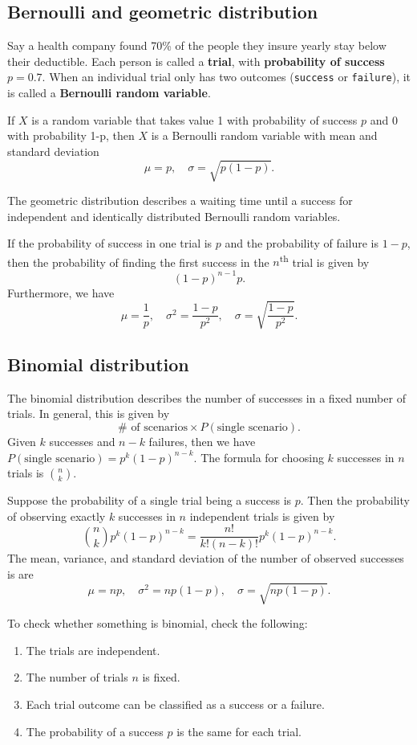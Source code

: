 \subsection{Bernoulli and geometric distribution}
Say a health company found 70\% of the people they insure yearly stay below their deductible. Each person is called a \textbf{trial}, with \textbf{probability of success} $p=0.7$. When an individual trial only has two outcomes (\texttt{success} or \texttt{failure}), it is called a \textbf{Bernoulli random variable}.
\begin{definition}[]
    If $X$ is a random variable that takes value 1 with probability of success $p$ and 0 with probability 1-p, then $X$ is a Bernoulli random variable with mean and standard deviation \[
        \mu =p,\quad \sigma=\sqrt{p(1-p)}. 
    \] 
\end{definition}
The geometric distribution describes a waiting time until a success for independent and identically distributed Bernoulli random variables.
\begin{definition}[]
    If the probability of success in one trial is $p$ and the probability of failure is $1-p$, then the probability of finding the first success in the $n$\textsuperscript{th} trial is given by \[
        (1-p) ^{n-1}p.
    \] Furthermore, we have \[
    \mu= \frac{1}{p},\quad \sigma^2= \frac{1-p}{p^2},\quad \sigma=\sqrt{\frac{1-p}{p^2}} .
    \] 
\end{definition}
\subsection{Binomial distribution}
The binomial distribution describes the number of successes in a fixed number of trials. In general, this is given by \[
    \# \text{ of scenarios} \times P(\text{single scenario}).
\] Given $k$ successes and $n-k$ failures, then we have $P(\text{single scenario})= p^k(1-p)^{n-k}$. The formula for choosing $k$ successes in $n$ trials is ${n\choose k} $.

\begin{definition}[]
    Suppose the probability of a single trial being a success is $p$. Then the probability of observing exactly $k$ successes in $n$ independent trials is given by \[
        {n\choose k} p^k(1-p)^{n-k} = \frac{n!}{k!(n-k)!}p^k (1-p)^{n-k}.
    \] The mean, variance, and standard deviation of the number of observed successes is are \[
    \mu = np, \quad \sigma^2= np(1-p),\quad \sigma= \sqrt{np(1-p)} .
    \] 
\end{definition}
To check whether something is binomial, check the following:
\begin{enumerate}[label=(\arabic*)]
\setlength\itemsep{-.2em}
    \item The trials are independent.
    \item The number of trials $n$ is fixed.
    \item Each trial outcome can be classified as a success or a failure.
    \item The probability of a success $p$ is the same for each trial.
\end{enumerate}
